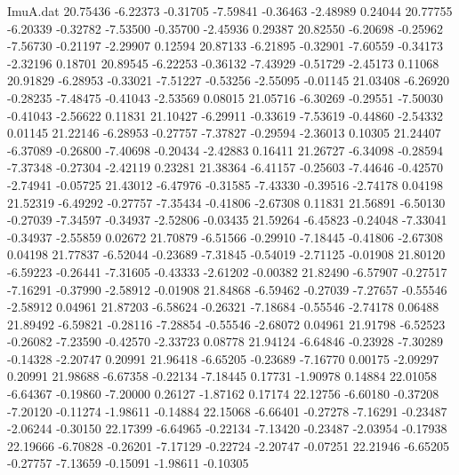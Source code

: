 \begin{filecontents}{ImuA.dat}
  20.75436   -6.22373   -0.31705   -7.59841   -0.36463   -2.48989    0.24044
  20.77755   -6.20339   -0.32782   -7.53500   -0.35700   -2.45936    0.29387
  20.82550   -6.20698   -0.25962   -7.56730   -0.21197   -2.29907    0.12594
  20.87133   -6.21895   -0.32901   -7.60559   -0.34173   -2.32196    0.18701
  20.89545   -6.22253   -0.36132   -7.43929   -0.51729   -2.45173    0.11068
  20.91829   -6.28953   -0.33021   -7.51227   -0.53256   -2.55095   -0.01145
  21.03408   -6.26920   -0.28235   -7.48475   -0.41043   -2.53569    0.08015
  21.05716   -6.30269   -0.29551   -7.50030   -0.41043   -2.56622    0.11831
  21.10427   -6.29911   -0.33619   -7.53619   -0.44860   -2.54332    0.01145
  21.22146   -6.28953   -0.27757   -7.37827   -0.29594   -2.36013    0.10305
  21.24407   -6.37089   -0.26800   -7.40698   -0.20434   -2.42883    0.16411
  21.26727   -6.34098   -0.28594   -7.37348   -0.27304   -2.42119    0.23281
  21.38364   -6.41157   -0.25603   -7.44646   -0.42570   -2.74941   -0.05725
  21.43012   -6.47976   -0.31585   -7.43330   -0.39516   -2.74178    0.04198
  21.52319   -6.49292   -0.27757   -7.35434   -0.41806   -2.67308    0.11831
  21.56891   -6.50130   -0.27039   -7.34597   -0.34937   -2.52806   -0.03435
  21.59264   -6.45823   -0.24048   -7.33041   -0.34937   -2.55859    0.02672
  21.70879   -6.51566   -0.29910   -7.18445   -0.41806   -2.67308    0.04198
  21.77837   -6.52044   -0.23689   -7.31845   -0.54019   -2.71125   -0.01908
  21.80120   -6.59223   -0.26441   -7.31605   -0.43333   -2.61202   -0.00382
  21.82490   -6.57907   -0.27517   -7.16291   -0.37990   -2.58912   -0.01908
  21.84868   -6.59462   -0.27039   -7.27657   -0.55546   -2.58912    0.04961
  21.87203   -6.58624   -0.26321   -7.18684   -0.55546   -2.74178    0.06488
  21.89492   -6.59821   -0.28116   -7.28854   -0.55546   -2.68072    0.04961
  21.91798   -6.52523   -0.26082   -7.23590   -0.42570   -2.33723    0.08778
  21.94124   -6.64846   -0.23928   -7.30289   -0.14328   -2.20747    0.20991
  21.96418   -6.65205   -0.23689   -7.16770    0.00175   -2.09297    0.20991
  21.98688   -6.67358   -0.22134   -7.18445    0.17731   -1.90978    0.14884
  22.01058   -6.64367   -0.19860   -7.20000    0.26127   -1.87162    0.17174
  22.12756   -6.60180   -0.37208   -7.20120   -0.11274   -1.98611   -0.14884
  22.15068   -6.66401   -0.27278   -7.16291   -0.23487   -2.06244   -0.30150
  22.17399   -6.64965   -0.22134   -7.13420   -0.23487   -2.03954   -0.17938
  22.19666   -6.70828   -0.26201   -7.17129   -0.22724   -2.20747   -0.07251
  22.21946   -6.65205   -0.27757   -7.13659   -0.15091   -1.98611   -0.10305

\end{filecontents}
